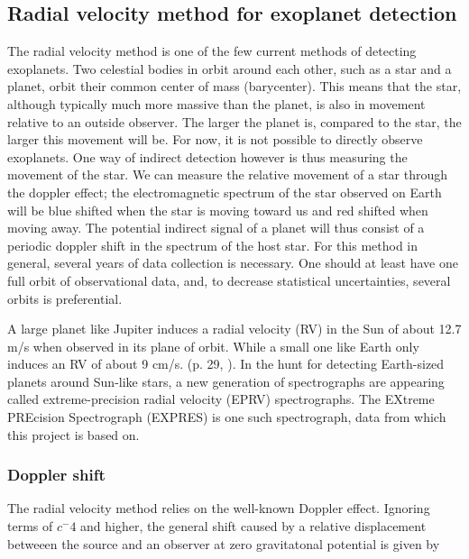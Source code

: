\subsection{Radial velocity method for exoplanet detection}
The radial velocity method is one of the few current methods of detecting exoplanets. Two celestial bodies in orbit around each other, such as a star and a planet, orbit their common center of mass (barycenter). This means that the star, although typically much more massive than the planet, is also in movement relative to an outside observer. The larger the planet is, compared to the star, the larger this movement will be. For now, it is not possible to directly observe exoplanets. One way of indirect detection however is thus measuring the movement of the star. We can measure the relative movement of a star through the doppler effect; the electromagnetic spectrum of the star observed on Earth will be blue shifted when the star is moving toward us and red shifted when moving away. The potential indirect signal of a planet will thus consist of a periodic doppler shift in the spectrum of the host star. For this method in general, several years of data collection is necessary. One should at least have one full orbit of observational data, and, to decrease statistical uncertainties, several orbits is preferential.

A large planet like Jupiter induces a radial velocity (RV) in the Sun of about 12.7 m/s when observed in its plane of orbit. While a small one like Earth only induces an RV of about 9 cm/s. (p. 29, \cite{radial_velocity_techniques}). In the hunt for detecting Earth-sized planets around Sun-like stars, a new generation of spectrographs are appearing called extreme-precision radial velocity (EPRV) spectrographs. The EXtreme PREcision Spectrograph (EXPRES) is one such spectrograph, data from which this project is based on. 

\vspace{0.5cm}

\subsubsection{Doppler shift}

The radial velocity method relies on the well-known Doppler effect. Ignoring terms of $c^-4$ and higher, the general shift caused by a relative displacement betweeen the source and an observer at zero gravitatonal potential is given by 

